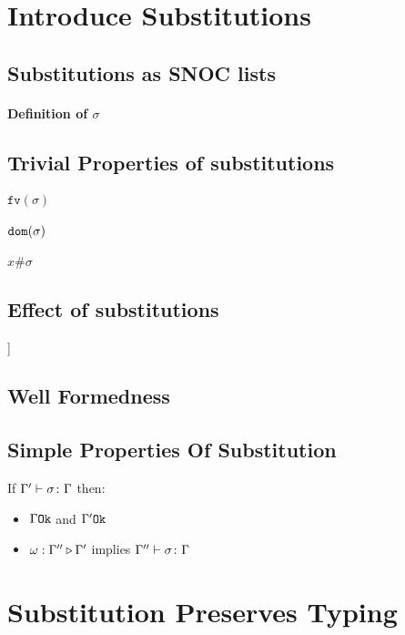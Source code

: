 \documentclass{report}
\renewcommand\s{\sigma}
\newcommand{\setto}{:=}
\newcommand{\fv}[1]{\texttt{fv}(#1)}
\begin{document}
    \section{Introduce Substitutions}
    \subsection{Substitutions as SNOC lists}
    \paragraph{Definition of $\s$}
    \subsection{Trivial Properties of substitutions}
    \paragraph{$\fv{\s}$}
    \paragraph{$\dom{\s}$}
    \paragraph{$x \# \s$}

    \subsection{Effect of substitutions}]
    \subsection{Well Formedness}
    \subsection{Simple Properties Of Substitution}
    If $\typerelation{\G'}{\s}{\G}$ then:
    \begin{itemize}
        \item $\Gamma \texttt{Ok}$ and $\Gamma' \texttt{Ok}$
        \item $\omega : \Gamma'' \triangleright \Gamma'$ implies $\typerelation{\G''}{\s}{\G}$
    \end{itemize}

    \section{Substitution Preserves Typing}
\end{document}
